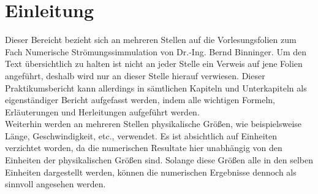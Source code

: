 \chapter{Einleitung}
Dieser Bereicht bezieht sich an mehreren Stellen auf die Vorlesungsfolien zum Fach Numerische Str\"omungssimmulation von Dr.-Ing. Bernd Binninger. Um den Text \"ubersichtlich zu halten ist nicht an jeder Stelle ein Verweis auf jene Folien angef\"uhrt, deshalb wird nur an dieser Stelle hierauf verwiesen. Dieser Praktikumsbericht kann allerdings in s\"amtlichen Kapiteln und Unterkapiteln als eigenst\"andiger Bericht aufgefasst werden, indem alle wichtigen Formeln, Erl\"auterungen und Herleitungen aufgef\"uhrt werden. \\[0.5cm]
Weiterhin werden an mehreren Stellen physikalische Gr\"o\ss{}en, wie beispielsweise L\"ange, Geschwindigkeit, etc., verwendet. Es ist absichtlich auf Einheiten verzichtet worden, da die numerischen Resultate hier unabh\"angig von den Einheiten der physikalischen Gr\"o\ss{}en sind. Solange diese Gr\"o\ss{}en alle in den selben Einheiten dargestellt werden, k\"onnen die numerischen Ergebnisse dennoch als sinnvoll angesehen werden.